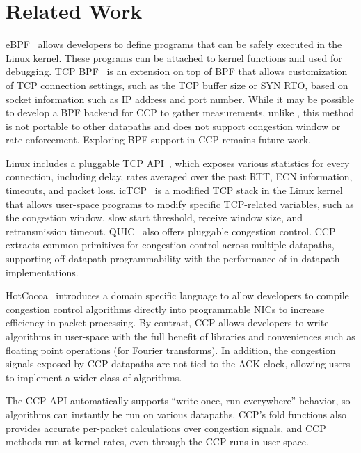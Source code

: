 \section{Related Work}
\label{s:relwork}

eBPF~\cite{ebpf} allows developers to define programs that can be safely executed in the Linux kernel. These programs can be attached to kernel functions and used for debugging. TCP BPF~\cite{tcpbpf} is an extension on top of BPF that allows customization of TCP connection settings, such as the TCP buffer size or SYN RTO, based on socket information such as IP address and port number. While it may be possible to develop a BPF backend for CCP to gather measurements, unlike , this method is not portable to other datapaths and does not support congestion window or rate enforcement. Exploring BPF support in CCP remains future work.

Linux includes a pluggable TCP API~\cite{lwn-pluggable-tcp}, which exposes various statistics for every connection, including delay, rates averaged over the past RTT, ECN information, timeouts, and packet loss. 
icTCP~\cite{icTCP} is a modified TCP stack in the Linux kernel that allows user-space programs to modify specific TCP-related variables, such as the congestion window, slow start threshold, receive window size, and retransmission timeout. QUIC~\cite{quic} also offers pluggable congestion control. CCP extracts common primitives for congestion control across multiple datapaths, supporting off-datapath programmability with the performance of in-datapath implementations.

HotCocoa~\cite{hotcocoa} introduces a domain specific language to allow developers to compile congestion control algorithms directly into  programmable NICs to increase efficiency in packet processing. By contrast, CCP allows developers to write algorithms in user-space with the full benefit of libraries and conveniences such as  floating point operations (\eg for Fourier transforms). 
In addition, the congestion signals exposed by CCP datapaths are not tied to the ACK clock, allowing users to implement a wider class of algorithms. 

The CCP API automatically supports ``write once, run everywhere'' behavior, so algorithms can instantly be run on various datapaths. CCP's fold functions also provides accurate per-packet calculations over congestion signals, and CCP methods run at kernel rates, even through the CCP runs in user-space.
\fi

